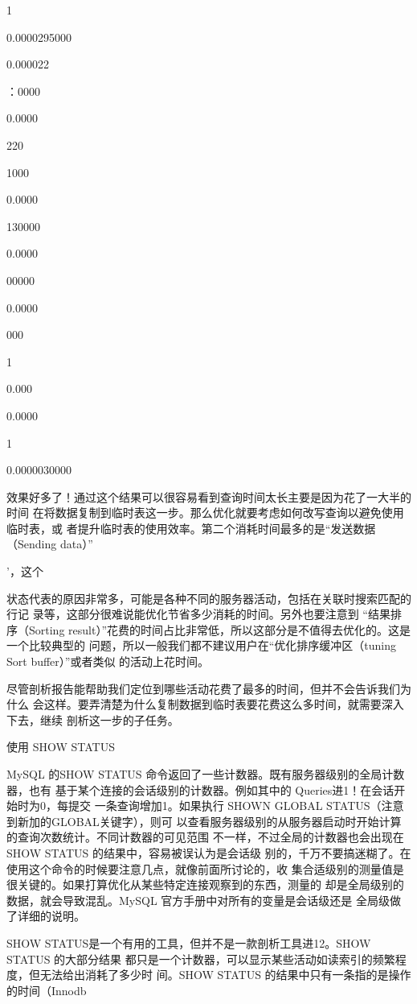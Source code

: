 {1

0.0000295000

0.000022

：0000

0.0000

220

1000

0.0000

130000

0.0000

00000

0.0000

000

1

0.000

0.0000

1

0.0000030000

效果好多了！通过这个结果可以很容易看到查询时间太长主要是因为花了一大半的时间
在将数据复制到临时表这一步。那么优化就要考虑如何改写查询以避免使用临时表，或
者提升临时表的使用效率。第二个消耗时间最多的是“发送数据（Sending data）”

'，这个

状态代表的原因非常多，可能是各种不同的服务器活动，包括在关联时搜索匹配的行记
录等，这部分很难说能优化节省多少消耗的时间。另外也要注意到 “结果排序（Sorting
result）”花费的时间占比非常低，所以这部分是不值得去优化的。这是一个比较典型的
问题，所以一般我们都不建议用户在“优化排序缓冲区（tuning Sort buffer）”或者类似
的活动上花时间。

尽管剖析报告能帮助我们定位到哪些活动花费了最多的时间，但并不会告诉我们为什么
会这样。要弄清楚为什么复制数据到临时表要花费这么多时间，就需要深入下去，继续
剖析这一步的子任务。

使用 SHOW STATUS

MySQL 的SHOW STATUS 命令返回了一些计数器。既有服务器级别的全局计数器，也有
基于某个连接的会话级别的计数器。例如其中的 Queries进1！在会话开始时为0，每提交
一条查询增加1。如果执行 SHOWN GLOBAL STATUS（注意到新加的GLOBAL关键字），则可
以查看服务器级别的从服务器启动时开始计算的查询次数统计。不同计数器的可见范围
不一样，不过全局的计数器也会出现在SHOW STATUS 的结果中，容易被误认为是会话级
别的，千万不要搞迷糊了。在使用这个命令的时候要注意几点，就像前面所讨论的，收
集合适级别的测量值是很关键的。如果打算优化从某些特定连接观察到的东西，测量的
却是全局级别的数据，就会导致混乱。MySQL 官方手册中对所有的变量是会话级还是
全局级做了详细的说明。

SHOW STATUS是一个有用的工具，但并不是一款剖析工具进12。SHOW STATUS 的大部分结果
都只是一个计数器，可以显示某些活动如读索引的频繁程度，但无法给出消耗了多少时
间。SHOW STATUS 的结果中只有一条指的是操作的时间（Innodb

}
